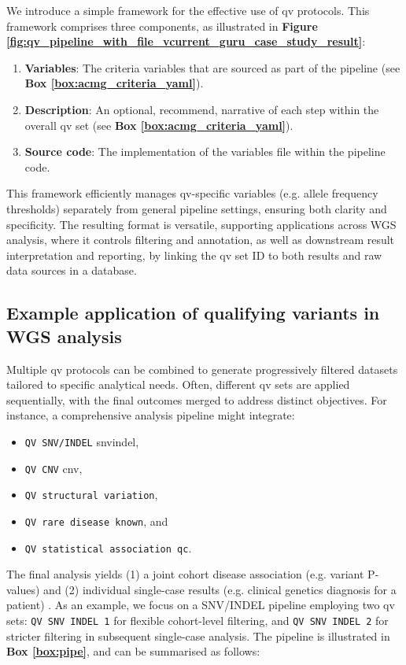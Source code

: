 We introduce a simple framework for the effective use of \ac{qv}  protocols. This framework comprises three components, as illustrated in \textbf{Figure \ref{fig:qv_pipeline_with_file_vcurrent_guru_case_study_result}}:
\begin{enumerate}
    \item \textbf{Variables}: The criteria variables that are sourced as part of the pipeline (see \textbf{Box \ref{box:acmg_criteria_yaml}}).
    \item \textbf{Description}: An optional, recommend, narrative of each step within the overall \ac{qv} set (see \textbf{Box \ref{box:acmg_criteria_yaml}}).
    \item \textbf{Source code}: The implementation of the variables file within the pipeline code.
\end{enumerate}

This framework efficiently manages \ac{qv}-specific variables (e.g. allele frequency thresholds) separately from general pipeline settings, ensuring both clarity and specificity. The resulting format is versatile, supporting applications across WGS analysis, where it controls filtering and annotation, as well as downstream result interpretation and reporting, by linking the \ac{qv} set ID to both results and raw data sources in a database.

\subsection{Example application of qualifying variants in WGS analysis}

Multiple \ac{qv} protocols can be combined to generate progressively filtered datasets tailored to specific analytical needs. Often, different \ac{qv} sets are applied sequentially, with the final outcomes merged to address distinct objectives. For instance, a comprehensive analysis pipeline might integrate:
\begin{itemize}
  \item \colorbox{kispiblue!30}{\texttt{QV SNV/INDEL}}  \ac{snvindel},
  \item \colorbox{kispiblue!30}{\texttt{QV CNV}} \ac{cnv},
  \item \colorbox{kispiblue!30}{\texttt{QV structural variation}},
  \item \colorbox{kispiblue!30}{\texttt{QV rare disease known}}, and 
  \item \colorbox{kispiblue!30}{\texttt{QV statistical association \ac{qc}}}.
\end{itemize}
The final analysis yields (1) a joint cohort disease association (e.g. variant P-values) and (2) individual single-case results (e.g. clinical genetics diagnosis for a patient)
\cite{auwera_genomics_2020, li2025statistical}.
As an example, we focus on a SNV/INDEL pipeline employing two \ac{qv} sets:
\colorbox{colorSUNSET2!60}{\texttt{QV SNV INDEL 1}} for flexible cohort-level filtering, and 
\colorbox{colorSUNSET2!60}{\texttt{QV SNV INDEL 2}} for stricter filtering in subsequent single-case analysis. The pipeline is illustrated in \textbf{Box \ref{box:pipe}}, and can be summarised as follows:

